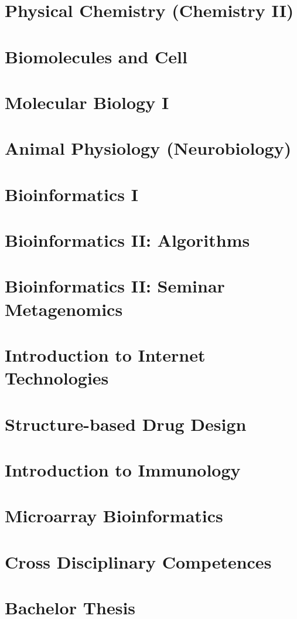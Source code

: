 \chapter{Physical Chemistry (Chemistry II)}


\chapter{Biomolecules and Cell}


\chapter{Molecular Biology I}


\chapter{Animal Physiology (Neurobiology)}


\chapter{Bioinformatics I}


\chapter{Bioinformatics II: Algorithms}


\chapter{Bioinformatics II: Seminar Metagenomics}


\chapter{Introduction to Internet Technologies}


\chapter{Structure-based Drug Design}


\chapter{Introduction to Immunology}


\chapter{Microarray Bioinformatics}


\chapter{Cross Disciplinary Competences}


\chapter{Bachelor Thesis}
